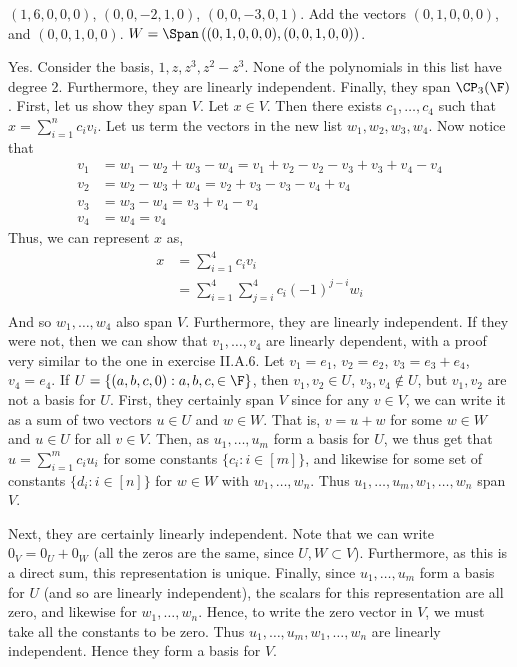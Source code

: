 \documentclass{book}
\begin{document}
\begin{enumerate}[label=\arabic*)]
\begin{enumerate}[label=\alph*)]
        \ii $(1, 6, 0, 0, 0)$, $(0, 0, -2, 1, 0)$, $(0, 0, -3, 0, 1)$.
        \ii Add the vectors $(0, 1, 0, 0, 0)$, and $(0, 0, 1, 0, 0)$.
        \ii $W = \Span\left((0, 1, 0, 0, 0), (0, 0, 1, 0, 0)\right)$.
      \end{enumerate}
    \ii Yes. Consider the basis, $1, z, z^3, z^2 - z^3$. None of the polynomials in this list have degree 2. Furthermore, they are linearly independent. Finally, they span
    $\CP_3(\F)$.
    \ii 
      First, let us show they span $V$. Let $x \in V$. Then there exists $c_1, \dots, c_4$ such that $x = \sum_{i = 1}^{n}c_iv_i$. Let us term the vectors in the new list $w_1,
      w_2, w_3, w_4$. Now notice
      that
      \begin{align*}
        v_1 & = w_1 - w_2 + w_3 - w_4 = v_1 + v_2 - v_2 - v_3 + v_3 + v_4 - v_4 \\
        v_2 & = w_2 - w_3 + w_4 = v_2 + v_3 - v_3 - v_4 + v_4 \\
        v_3 & = w_3 - w_4 = v_3 + v_4 - v_4 \\
        v_4 & = w_4 = v_4
      \end{align*}
      Thus, we can represent $x$ as,
      \begin{align*}
        x & = \sum_{i = 1}^{4}c_iv_i \\
        & = \sum_{i = 1}^{4}\sum_{j = i}^{4}c_i(-1)^{j - i}w_i\\
      \end{align*}
      And so $w_1, \dots, w_4$ also span $V$. Furthermore, they are linearly independent. If they were not, then we can show that $v_1, \dots, v_4$ are linearly dependent, with
      a proof very similar to the one in exercise II.A.6.
    \ii 
      Let $v_1 = e_1$, $v_2 = e_2$, $v_3 = e_3 + e_4$, $v_4 = e_4$. If $U = \{(a, b, c, 0): a, b, c, \in \F\}$, then $v_1, v_2 \in U$, $v_3, v_4 \not\in U$, but $v_1, v_2$ are
      not a basis for $U$.
    \ii
      First, they certainly span $V$ since for any $v \in V$, we can write it as a sum of two vectors $u \in U$ and $w \in W$. That is, $v = u + w$ for some $w \in W$ and $u
      \in U$ for all $v \in V$. Then, as $u_1, \dots, u_m$ form a basis for $U$, we thus get that $u = \sum_{i = 1}^{m}c_iu_i$ for some constants $\{c_i: i \in [m]\}$, and
      likewise for some set of constants $\{d_i: i \in [n]\}$ for $w \in W$ with $w_1, \dots, w_n$. Thus $u_1, \dots, u_m, w_1, \dots, w_n$ span $V$.

      Next, they are certainly linearly independent. Note that we can write $0_V = 0_U + 0_W$ (all the zeros are the same, since $U, W \subset V$). Furthermore, as this is a
      direct sum, this representation is unique. Finally, since $u_1, \dots, u_m$ form a basis for $U$ (and so are linearly independent), the scalars for this representation
      are all zero, and likewise for $w_1, \dots, w_n$. Hence, to write the zero vector in $V$, we must take all the constants to be zero. Thus $u_1, \dots, u_m, w_1, \dots,
      w_n$ are linearly independent. Hence they form a basis for $V$.
  \end{enumerate}
\end{document}
